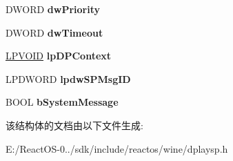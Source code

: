 \begin{DoxyCompactItemize}
\mbox{\label{structtag_d_p_s_p___s_e_n_d_e_x_d_a_t_a_a529a767c6538be6e6408f390b4e014ee}} 
D\+W\+O\+RD {\bfseries dw\+Priority}
\item 
\mbox{\label{structtag_d_p_s_p___s_e_n_d_e_x_d_a_t_a_a7904a96eaaf2119610719e255ab788a7}} 
D\+W\+O\+RD {\bfseries dw\+Timeout}
\item 
\mbox{\label{structtag_d_p_s_p___s_e_n_d_e_x_d_a_t_a_ab3334b3c0cf98c81f4d8882365339da8}} 
\hyperlink{interfacevoid}{L\+P\+V\+O\+ID} {\bfseries lp\+D\+P\+Context}
\item 
\mbox{\label{structtag_d_p_s_p___s_e_n_d_e_x_d_a_t_a_a00dbfe21e14e6a9cb1eb6d8a1b295b49}} 
L\+P\+D\+W\+O\+RD {\bfseries lpdw\+S\+P\+Msg\+ID}
\item 
\mbox{\label{structtag_d_p_s_p___s_e_n_d_e_x_d_a_t_a_a4b2d90d9bbec2a2f3919d00dea82b100}} 
B\+O\+OL {\bfseries b\+System\+Message}
\end{DoxyCompactItemize}


该结构体的文档由以下文件生成\+:\begin{DoxyCompactItemize}
\item 
E\+:/\+React\+O\+S-\/0../sdk/include/reactos/wine/dplaysp.\+h\end{DoxyCompactItemize}
